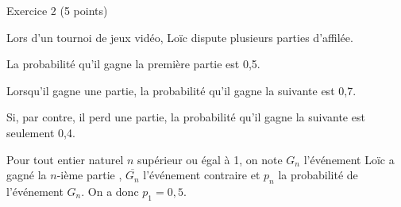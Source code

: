 
%
\begin{h2}Exercice 2 (5 points)\end{h2}
\par
Lors d'un tournoi de jeux vidéo, Loïc dispute plusieurs parties d'affilée.
\par
La probabilité qu'il gagne la première partie est 0,5.
\par
Lorsqu'il gagne une partie, la probabilité qu'il gagne la suivante est 0,7.
\par
Si, par contre, il perd une partie, la probabilité qu'il gagne la suivante est seulement 0,4.
\par
Pour tout entier naturel $n$ supérieur ou égal à 1, on note $G_n$ l'événement \og Loïc a gagné la $n$-ième partie \fg{}, $\overline{G_n}$ l'événement contraire et $p_n$ la probabilité de l'événement $G_n$. On a donc $p_1=0,5$.
\par

